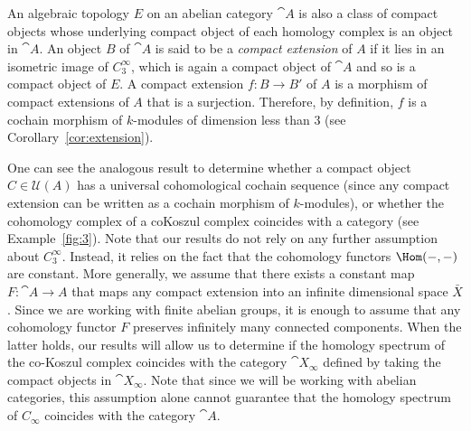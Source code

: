 \documentclass[a4paper,reqno,oneside]{article}
\begin{document}
An algebraic topology $E$ on an abelian category $\cat{A}$ is also a class of compact objects whose underlying compact object of each homology complex is an object in $\cat{A}$. An object $B$ of $\cat{A}$ is said to be a \emph{compact extension} of $A$ if it lies in an isometric image of $C^{\infty}_{3}$, which is again a compact object of $\cat{A}$ and so is a compact object of $E$. A compact extension $f:B\rightarrow B'$ of $A$ is a morphism of compact extensions of $A$ that is a surjection. Therefore, by definition, $f$ is a cochain morphism of $k$-modules of dimension less than $3$ (see Corollary~\ref{cor:extension}).

One can see the analogous result to determine whether a compact object $C\in\mathcal{U}(A)$ has a universal cohomological cochain sequence (since any compact extension can be written as a cochain morphism of $k$-modules), or whether the cohomology complex of a coKoszul complex coincides with a category (see Example~\ref{fig:3}).
Note that our results do not rely on any further assumption about $C^{\infty}_{3}$. Instead, it relies on the fact that the cohomology functors $\Hom(-,-)$ are constant. More generally, we assume that there exists a constant map $F:\cat{A}\rightarrow A$ that maps any compact extension into an infinite dimensional space $\bar{X}$. Since we are working with finite abelian groups, it is enough to assume that any cohomology functor $F$ preserves infinitely many connected components. When the latter holds, our results will allow us to determine if the homology spectrum of the co-Koszul complex coincides with the category $\cat{X}_{\infty}$ defined by taking the compact objects in $\cat{X}_{\infty}$. Note that since we will be working with abelian categories, this assumption alone cannot guarantee that the homology spectrum of $C_{\infty}$ coincides with the category $\cat{A}$.
\end{document}
